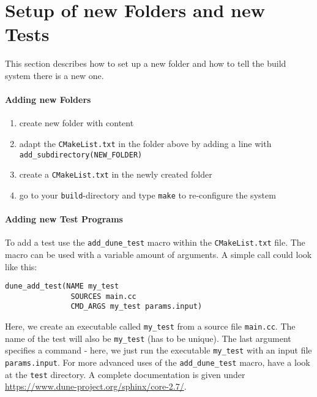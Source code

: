 \section{Setup of new Folders and new Tests}
\label{sc_newfoldersetup}
This section describes how to set up a new folder and how to tell
the build system there is a new one.
\paragraph{Adding new Folders}
\begin{enumerate}[1)]
 \item create new folder with content
 \item adapt the \verb+CMakeList.txt+ in the folder above by adding a line with
       \verb+add_subdirectory(NEW_FOLDER)+
 \item create a \verb+CMakeList.txt+ in the newly created folder
 \item go to your \texttt{build}-directory and type \verb+make+ to
       re-configure the system
\end{enumerate}

\paragraph{Adding new Test Programs}
\noindent To add a test use the \texttt{add\_dune\_test} macro within the \texttt{CMakeList.txt} file.
The macro can be used with a variable amount of arguments. A simple call could look like this:

\begin{lstlisting}[style=DumuxCode]
dune_add_test(NAME my_test
               SOURCES main.cc
               CMD_ARGS my_test params.input)
\end{lstlisting}

Here, we create an executable called \texttt{my\_test} from a source file \texttt{main.cc}.
The name of the test will also be \texttt{my\_test} (has to be unique). The last argument specifies a command - here, we just run the executable \texttt{my\_test} with an input file \texttt{params.input}. For more advanced uses of
the \texttt{add\_dune\_test} macro, have a look at the \texttt{test} directory. A complete documentation is given under \url{https://www.dune-project.org/sphinx/core-2.7/}.
